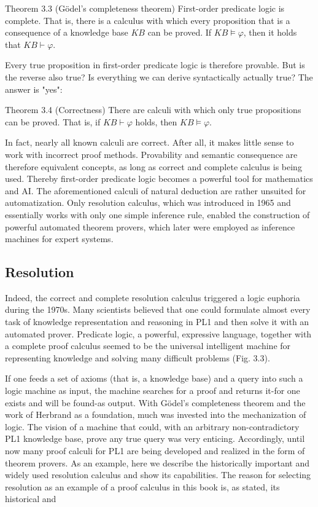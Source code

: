 \documentclass[10pt]{book}
\begin{document}
Theorem 3.3 (Gödel's completeness theorem) First-order predicate logic is complete. That is, there is a calculus with which every proposition that is a consequence of a knowledge base $K B$ can be proved. If $K B \models \varphi$, then it holds that $K B \vdash \varphi$.

Every true proposition in first-order predicate logic is therefore provable. But is the reverse also true? Is everything we can derive syntactically actually true? The answer is "yes":

Theorem 3.4 (Correctness) There are calculi with which only true propositions can be proved. That is, if $K B \vdash \varphi$ holds, then $K B \models \varphi$.

In fact, nearly all known calculi are correct. After all, it makes little sense to work with incorrect proof methods. Provability and semantic consequence are therefore equivalent concepts, as long as correct and complete calculus is being used. Thereby first-order predicate logic becomes a powerful tool for mathematics and AI. The aforementioned calculi of natural deduction are rather unsuited for automatization. Only resolution calculus, which was introduced in 1965 and essentially works with only one simple inference rule, enabled the construction of powerful automated theorem provers, which later were employed as inference machines for expert systems.

\subsection{Resolution}
Indeed, the correct and complete resolution calculus triggered a logic euphoria during the 1970s. Many scientists believed that one could formulate almost every task of knowledge representation and reasoning in PL1 and then solve it with an automated prover. Predicate logic, a powerful, expressive language, together with a complete proof calculus seemed to be the universal intelligent machine for representing knowledge and solving many difficult problems (Fig. 3.3).

If one feeds a set of axioms (that is, a knowledge base) and a query into such a logic machine as input, the machine searches for a proof and returns it-for one exists and will be found-as output. With Gödel's completeness theorem and the work of Herbrand as a foundation, much was invested into the mechanization of logic. The vision of a machine that could, with an arbitrary non-contradictory PL1 knowledge base, prove any true query was very enticing. Accordingly, until now many proof calculi for PL1 are being developed and realized in the form of theorem provers. As an example, here we describe the historically important and widely used resolution calculus and show its capabilities. The reason for selecting resolution as an example of a proof calculus in this book is, as stated, its historical and
\end{document}
